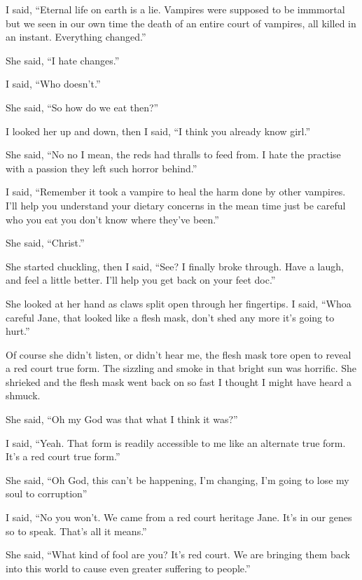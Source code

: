 I said, ``Eternal life on earth is a lie. Vampires were supposed to be immmortal but we seen in our own time the death of an entire court of vampires, all killed in an instant. Everything changed.''

She said, ``I hate changes.''

I said, ``Who doesn't.''

She said, ``So how do we eat then?''

I looked her up and down, then I said, ``I think you already know girl.''

She said, ``No no I mean, the reds had thralls to feed from. I hate the practise with a passion they left such horror behind.''

I said, ``Remember it took a vampire to heal the harm done by other vampires. I'll help you understand your dietary concerns in the mean time just be careful who you eat you don't know where they've been.''

She said, ``Christ.''

She started chuckling, then I said, ``See? I finally broke through. Have a laugh, and feel a little better. I'll help you get back on your feet doc.''

She looked at her hand as claws split open through her fingertips. I said, ``Whoa careful Jane, that looked like a flesh mask, don't shed any more it's going to hurt.''

Of course she didn't listen, or didn't hear me, the flesh mask tore open to reveal a red court true form. The sizzling and smoke in that bright sun was horrific. She shrieked and the flesh mask went back on so fast I thought I might have heard a shmuck.

She said, ``Oh my God was that what I think it was?''

I said, ``Yeah. That form is readily accessible to me like an alternate true form. It's a red court true form.''

She said, ``Oh God, this can't be happening, I'm changing, I'm going to lose my soul to corruption''

I said, ``No you won't. We came from a red court heritage Jane. It's in our genes so to speak. That's all it means.''

She said, ``What kind of fool are you? It's red court. We are bringing them back into this world to cause even greater suffering to people.''

